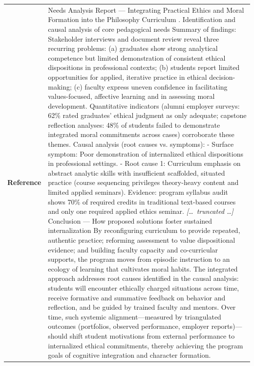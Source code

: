 \begin{longtable}{@{}l p{12.5cm}@{}}
  \textbf{Reference} & Needs Analysis Report --- Integrating Practical Ethics and Moral Formation into the Philosophy Curriculum \newline 1. Identification and causal analysis of core pedagogical needs \newline Summary of findings: Stakeholder interviews and document review reveal three recurring problems: (a) graduates show strong analytical competence but limited demonstration of consistent ethical dispositions in professional contexts; (b) students report limited opportunities for applied, iterative practice in ethical decision-making; (c) faculty express uneven confidence in facilitating values-focused, affective learning and in assessing moral development. Quantitative indicators (alumni employer surveys: 62\% rated graduates' ethical judgment as only adequate; capstone reflection analyses: 48\% of students failed to demonstrate integrated moral commitments across cases) corroborate these themes. \newline Causal analysis (root causes vs. symptoms): \newline - Surface symptom: Poor demonstration of internalized ethical dispositions in professional settings. \newline - Root cause 1: Curriculum emphasis on abstract analytic skills with insufficient scaffolded, situated practice (course sequencing privileges theory-heavy content and limited applied seminars). Evidence: program syllabus audit shows 70\% of required credits in traditional text-based courses and only one required applied ethics seminar. \newline \textit{[\ldots\ truncated \ldots]} \newline Conclusion --- How proposed solutions foster sustained internalization \newline By reconfiguring curriculum to provide repeated, authentic practice; reforming assessment to value dispositional evidence; and building faculty capacity and co-curricular supports, the program moves from episodic instruction to an ecology of learning that cultivates moral habits. The integrated approach addresses root causes identified in the causal analysis: students will encounter ethically charged situations across time, receive formative and summative feedback on behavior and reflection, and be guided by trained faculty and mentors. Over time, such systemic alignment---measured by triangulated outcomes (portfolios, observed performance, employer reports)---should shift student motivations from external performance to internalized ethical commitments, thereby achieving the program goals of cognitive integration and character formation. \\

\end{longtable}

